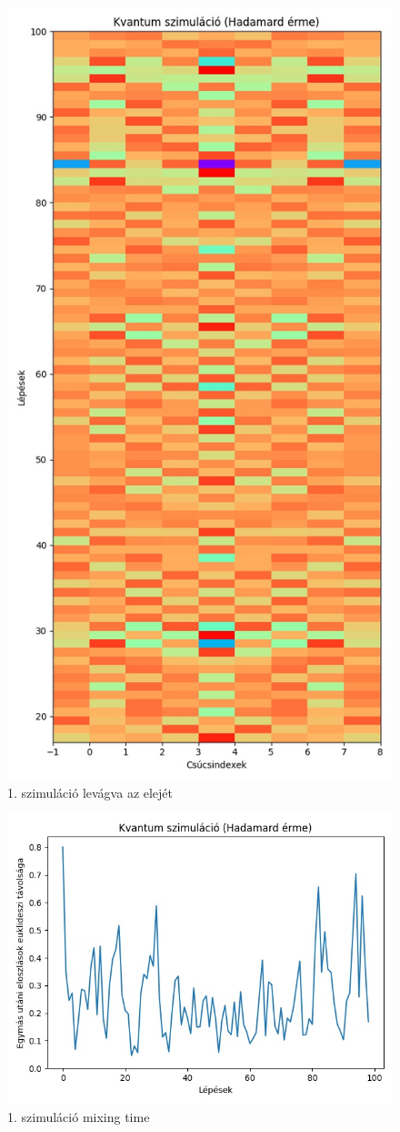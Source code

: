 \documentclass[14pt,a4paper]{article}
\begin{document}
\begin{figure}[H]
\centering
\includegraphics[width = 0.7\columnwidth]{sim_01/counts_short.jpg}
\caption{1. szimuláció levágva az elejét}
\end{figure}
\begin{figure}[H]
\centering
\includegraphics[width = 0.7\columnwidth]{sim_01/mixing_time.jpg}
\caption{1. szimuláció mixing time}
\end{figure}
\end{document}
